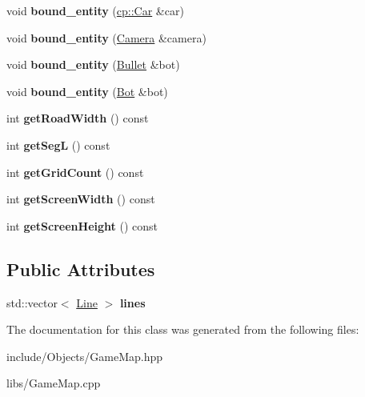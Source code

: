 \begin{DoxyCompactItemize}
\item 
\mbox{\label{classcp_1_1_game_map_a2bf537aba9c69a5916fd764afb7200a8}} 
void {\bfseries bound\+\_\+entity} (\hyperlink{classcp_1_1_car}{cp\+::\+Car} \&car)
\item 
\mbox{\label{classcp_1_1_game_map_a0909cc97e391b711c7770497dffc97d3}} 
void {\bfseries bound\+\_\+entity} (\hyperlink{classcp_1_1_camera}{Camera} \&camera)
\item 
\mbox{\label{classcp_1_1_game_map_a15e718a61f5244d39e38d425abcfef2c}} 
void {\bfseries bound\+\_\+entity} (\hyperlink{classcp_1_1_bullet}{Bullet} \&bot)
\item 
\mbox{\label{classcp_1_1_game_map_af82e3be51eb1f7fdab4d63951cdbd9a0}} 
void {\bfseries bound\+\_\+entity} (\hyperlink{classcp_1_1_bot}{Bot} \&bot)
\item 
\mbox{\label{classcp_1_1_game_map_a2138ff88fac07ca7bda38f5e6ca62482}} 
int {\bfseries get\+Road\+Width} () const
\item 
\mbox{\label{classcp_1_1_game_map_a344251cc113beee042a81463c463dc60}} 
int {\bfseries get\+SegL} () const
\item 
\mbox{\label{classcp_1_1_game_map_a34146066a652c4e0a116798ced95fe9e}} 
int {\bfseries get\+Grid\+Count} () const
\item 
\mbox{\label{classcp_1_1_game_map_ae3d81ba9ab7c751c3c1f6544e0154e87}} 
int {\bfseries get\+Screen\+Width} () const
\item 
\mbox{\label{classcp_1_1_game_map_a139f350c0b7788a4c35cadc3c242d009}} 
int {\bfseries get\+Screen\+Height} () const
\end{DoxyCompactItemize}
\subsection*{Public Attributes}
\begin{DoxyCompactItemize}
\item 
\mbox{\label{classcp_1_1_game_map_a328bd85db8064dc4e65d2a615e215968}} 
std\+::vector$<$ \hyperlink{classcp_1_1_line}{Line} $>$ {\bfseries lines}
\end{DoxyCompactItemize}


The documentation for this class was generated from the following files\+:\begin{DoxyCompactItemize}
\item 
include/\+Objects/Game\+Map.\+hpp\item 
libs/Game\+Map.\+cpp\end{DoxyCompactItemize}
